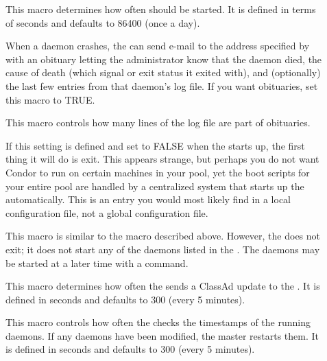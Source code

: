 \begin{description}
\item[] \label{param:PreenInterval} This macro
  determines how often  should be started.  It is
  defined in terms of seconds and defaults to 86400 (once a day).

\item[] \label{param:PublishObituaries}
  When a daemon crashes, the  can send e-mail to the
  address specified by  with an obituary letting
  the administrator know that the daemon died, the cause of
  death (which signal or exit status it exited with), and
  (optionally) the last few entries from that daemon's log file.  If
  you want obituaries, set this macro to TRUE.

\item[] \label{param:ObituaryLogLength}
  This macro controls how many lines
  of the log file are part of obituaries.

\item[] \label{param:StartMaster} If this setting
  is defined and set to FALSE when the  starts up, the first
  thing it will do is exit.  This appears strange, but perhaps you
  do not want Condor to run on certain machines in your pool, yet
  the boot scripts for your entire pool are handled by a centralized
  system that starts up the  automatically.  This is
  an entry you would most likely find in a local configuration file,
  not a global configuration file.

\item[] \label{param:StartDaemons} This macro
  is similar to the  macro described above.
  However, the  does not exit; it does not start any
  of the daemons listed in the .
  The daemons may be started at a later time with a 
  command.

\item[]
  \label{param:MasterUpdateInterval} This macro determines how often
  the  sends a ClassAd update to the
  .  It is defined in seconds and defaults to 300
  (every 5 minutes).
  
\item[]
  \label{param:MasterCheckNewExecInterval} This
  macro controls how often the  checks the timestamps
  of the running daemons.  If any daemons have been modified, the
  master restarts them.  It is defined in seconds and defaults to 300
  (every 5 minutes).


\end{description}
